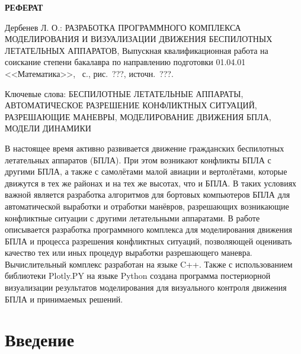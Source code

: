 \documentclass[a4paper,12pt]{article}
\begin{document}
\newpage
\thispagestyle{plain}

\begin{center}
  \textbf{РЕФЕРАТ}  	
\end{center}

\vspace{4mm}

\noindent
Дербенев Л. О.: РАЗРАБОТКА ПРОГРАММНОГО КОМПЛЕКСА МОДЕЛИРОВАНИЯ И ВИЗУАЛИЗАЦИИ ДВИЖЕНИЯ БЕСПИЛОТНЫХ ЛЕТАТЕЛЬНЫХ АППАРАТОВ, Выпускная квалификационная работа на соискание степени бакалавра по направлению подготовки 01.04.01 <<Математика>>, \pageref{LastPage}~с., рис.~???, источн.~???.

\bigskip

{\raggedright
\noindent
Ключевые слова: БЕСПИЛОТНЫЕ ЛЕТАТЕЛЬНЫЕ АППАРАТЫ, АВТОМАТИЧЕСКОЕ РАЗРЕШЕНИЕ КОНФЛИКТНЫХ СИТУАЦИЙ, РАЗРЕШАЮЩИЕ МАНЕВРЫ, МОДЕЛИРОВАНИЕ ДВИЖЕНИЯ БПЛА, МОДЕЛИ ДИНАМИКИ

}

\bigskip

\noindent
В настоящее время активно развивается движение гражданских беспилотных летательных аппаратов (БПЛА). При этом возникают конфликты БПЛА с другими БПЛА, а также с самолётами малой авиации и вертолётами, которые движутся в тех же районах и на тех же высотах, что и БПЛА. В таких условиях важной является разработка алгоритмов для бортовых компьютеров БПЛА для автоматической выработки и отработки манёвров, разрешающих возникающие конфликтные ситуации с другими летательными аппаратами. В работе описывается разработка программного комплекса для моделирования движения БПЛА и процесса разрешения конфликтных ситуаций, позволяющей оценивать качество тех или иных процедур выработки разрешающего маневра. Вычислительный комплекс разработан на языке C++. Также с использованием библиотеки Plotly.PY на языке Python создана программа постериорной визуализации результатов моделирования для визуального контроля движения БПЛА и принимаемых решений. 
  

\newpage
\setcounter{page}{2}
\tableofcontents
\newpage

\newpage
\section*{Введение}
\end{document}
